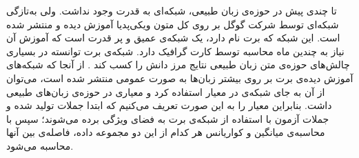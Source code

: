 \newline
تا چندی پیش در حوزه‌ی زبان طبیعی، شبکه‌ا‌ی به قدرت
وجود نداشت. 
ولی به‌تازگی شبکه‌ای توسط شرکت گوگل بر روی کل متون ویکی‌پدیا آموزش دیده و منتشر شده است. این شبکه که برت نام دارد، یک شبکه‌ی عمیق و پر قدرت است که آموزش آن نیاز به چندین ماه محاسبه توسط کارت گرافیک دارد. شبکه‌ی برت توانسته در بسیاری چالش‌های حوزه‌ی متن زبان طبیعی  نتایج مرز دانش را کسب کند
\cite{devlin2018bert}.
از آنجا که شبکه‌های آموزش دیده‌ی برت بر روی بیشتر زبان‌ها به صورت عمومی منتشر شده است،
می‌توان از آن به جای شبکه‌ی
در معیار 
استفاده کرد و معیاری در حوزه‌ی زبان‌های طبیعی داشت.
\newline
بنابراین معیار 
را به این صورت تعریف می‌کنیم که ابتدا جملات تولید شده و جملات آزمون با استفاده از شبکه‌ی برت به فضای ویژگی برده می‌شوند؛ سپس با محاسبه‌ی میانگین و کواریانس هر کدام از این دو مجموعه داده، فاصله‌ی 
بین آنها محاسبه می‌شود.
